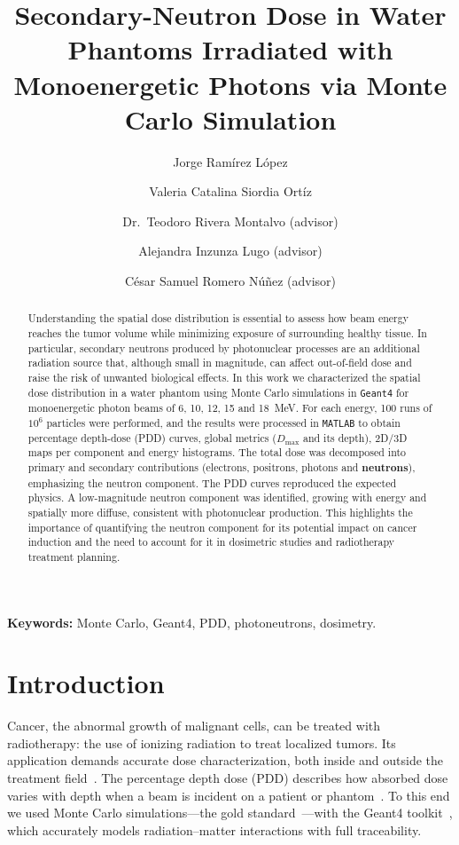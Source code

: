 \documentclass[11pt,a4paper]{article}
\title{\textbf{Secondary-Neutron Dose in Water Phantoms Irradiated with
Monoenergetic Photons via Monte Carlo Simulation}}
\author[1]{Jorge Ram\'irez L\'opez}
\author[2]{Valeria Catalina Siordia Ort\'iz}
\author[3]{Dr.\ Teodoro Rivera Montalvo (advisor)}
\author[3]{Alejandra Inzunza Lugo (advisor)}
\author[3]{C\'esar Samuel Romero N\'u\~nez (advisor)}
\affil[1]{Physics B.Sc., Division of Basic Sciences, CUCEI, University of Guadalajara \\ \texttt{jorge.ramirez9331@alumnos.udg.mx}}
\affil[2]{Biomedical Engineering, Tlajomulco University Center, University of Guadalajara}
\affil[3]{Dosimetry Laboratory, CICATA Legaria Unit, Instituto Polit\'ecnico Nacional}
\date{}
\begin{document}
\maketitle

\begin{abstract}
\noindent
Understanding the spatial dose distribution is essential to assess how beam energy
reaches the tumor volume while minimizing exposure of surrounding healthy tissue. In
particular, secondary neutrons produced by photonuclear processes are an additional
radiation source that, although small in magnitude, can affect out-of-field dose and
raise the risk of unwanted biological effects. In this work we characterized the
spatial dose distribution in a water phantom using Monte Carlo simulations in
\texttt{Geant4} for monoenergetic photon beams of 6, 10, 12, 15 and 18~MeV. For each
energy, 100 runs of \(10^{6}\) particles were performed, and the results were
processed in \texttt{MATLAB} to obtain percentage depth-dose (PDD) curves, global
metrics (\(D_{\max}\) and its depth), 2D/3D maps per component and energy histograms.
The total dose was decomposed into primary and secondary contributions (electrons,
positrons, photons and \textbf{neutrons}), emphasizing the neutron component. The PDD
curves reproduced the expected physics. A low-magnitude neutron component was
identified, growing with energy and spatially more diffuse, consistent with
photonuclear production. This highlights the importance of quantifying the neutron
component for its potential impact on cancer induction and the need to account for it
in dosimetric studies and radiotherapy treatment planning.
\end{abstract}

\noindent\textbf{Keywords:} Monte Carlo, Geant4, PDD, photoneutrons, dosimetry.

\section{Introduction}
Cancer, the abnormal growth of malignant cells, can be treated with radiotherapy: the
use of ionizing radiation to treat localized tumors. Its application demands accurate
dose characterization, both inside and outside the treatment
field~\cite{khan2014radiation}. The percentage depth dose (PDD) describes how
absorbed dose varies with depth when a beam is incident on a patient or
phantom~\cite{khan2014radiation}. To this end we used Monte Carlo simulations---the
gold standard~\cite{fielding2023montecarlo}---with the Geant4
toolkit~\cite{agostinelli2003geant4}, which accurately models radiation--matter
interactions with full traceability.
\end{document}

